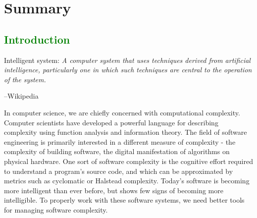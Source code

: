 \documentclass[12pt,initial,twoside,maitrise]{dms}
\newcommand{\mediumwell}[1]{\textcolor{green}{#1}}
\numberwithin{equation}{section}
\numberwithin{table}{chapter}
\numberwithin{figure}{chapter}
\begin{document}

\chapter*{Summary}


\anglais
\cleardoublepage
{}  %
\tableofcontents
\cleardoublepage
{}  %
\listoftables
\cleardoublepage
{}
\listoffigures

\NoChapterPageNumber
\cleardoublepage
{}

\mediumwell{\chapter{Introduction}\label{ch:introduction}}

\setlength{\epigraphwidth}{0.9\textwidth}
\epigraph{Intelligent system: \textit{A computer system that uses techniques derived from artificial intelligence, particularly one in which such techniques are central to the operation of the system.}}{\begin{flushright}--Wikipedia\end{flushright}}

In computer science, we are chiefly concerned with computational complexity. Computer scientists have developed a powerful language for describing complexity using function analysis and information theory. The field of software engineering is primarily interested in a different measure of complexity - the complexity of building software, the digital manifestation of algorithms on physical hardware. One sort of software complexity is the cognitive effort required to understand a program's source code, and which can be approximated by metrics such as cyclomatic or Halstead complexity. Today's software is becoming more intelligent than ever before, but shows few signs of becoming more intelligible. To properly work with these software systems, we need better tools for managing software complexity.
\end{document}

